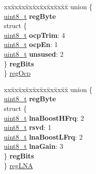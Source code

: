 \begin{DoxyCompactItemize}
\begin{tabbing}
\end{tabbing}\item 
\begin{tabbing}
xx\=xx\=xx\=xx\=xx\=xx\=xx\=xx\=xx\=\kill
union \{\\
\>\hyperlink{vl53l0x__types_8h_aba7bc1797add20fe3efdf37ced1182c5}{uint8\_t} {\bfseries regByte}\\
\>struct \{\\
\>\>\hyperlink{vl53l0x__types_8h_aba7bc1797add20fe3efdf37ced1182c5}{uint8\_t} {\bfseries ocpTrim}: 4\\
\>\>\hyperlink{vl53l0x__types_8h_aba7bc1797add20fe3efdf37ced1182c5}{uint8\_t} {\bfseries ocpEn}: 1\\
\>\>\hyperlink{vl53l0x__types_8h_aba7bc1797add20fe3efdf37ced1182c5}{uint8\_t} {\bfseries unsused}: 2\\
\>\} {\bfseries regBits}\\
\} \hyperlink{structFSK__Register__Map_aa49ab7f4dd97ce2b98987c6a4f9b9ede}{regOcp}\\

\end{tabbing}\item 
\begin{tabbing}
xx\=xx\=xx\=xx\=xx\=xx\=xx\=xx\=xx\=\kill
union \{\\
\>\hyperlink{vl53l0x__types_8h_aba7bc1797add20fe3efdf37ced1182c5}{uint8\_t} {\bfseries regByte}\\
\>struct \{\\
\>\>\hyperlink{vl53l0x__types_8h_aba7bc1797add20fe3efdf37ced1182c5}{uint8\_t} {\bfseries lnaBoostHFrq}: 2\\
\>\>\hyperlink{vl53l0x__types_8h_aba7bc1797add20fe3efdf37ced1182c5}{uint8\_t} {\bfseries rsvd}: 1\\
\>\>\hyperlink{vl53l0x__types_8h_aba7bc1797add20fe3efdf37ced1182c5}{uint8\_t} {\bfseries lnaBoostLFrq}: 2\\
\>\>\hyperlink{vl53l0x__types_8h_aba7bc1797add20fe3efdf37ced1182c5}{uint8\_t} {\bfseries lnaGain}: 3\\
\>\} {\bfseries regBits}\\
\} \hyperlink{structFSK__Register__Map_afe20c0732a7f6fb5e2234a1253c46d2f}{regLNA}\\


\end{tabbing}
\end{DoxyCompactItemize}
